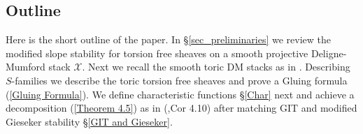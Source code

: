 \documentclass[10pt]{amsart}
\newcommand{\sX}{{\mathcal X}}
\numberwithin{equation}{subsection}
\begin{document}



\subsection{Outline}
Here is the short outline of the paper.  In \S \ref{sec_preliminaries} we review the modified slope stability for torsion free sheaves on a smooth projective Deligne-Mumford stack $\sX.$ Next we recall the smooth toric DM stacks as in \cite{BCS}. Describing $S$-families we describe the toric torsion free sheaves and prove a Gluing formula (\ref{Gluing Formula}). We define characteristic functions \S \ref{Char} next and achieve a decomposition (\ref{Theorem 4.5}) as in (\cite{Koo2},Cor 4.10) after matching GIT and modified Gieseker stability \S \ref{GIT and Gieseker}. %
\end{document}
